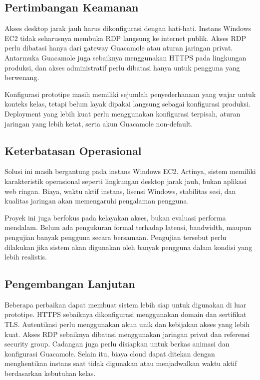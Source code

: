 \documentclass[conference]{IEEEtran}
\begin{document}
\subsection{Pertimbangan Keamanan}

Akses desktop jarak jauh harus dikonfigurasi dengan hati-hati. Instans Windows EC2 tidak seharusnya membuka RDP langsung ke internet publik. Akses RDP perlu dibatasi hanya dari gateway Guacamole atau aturan jaringan privat. Antarmuka Guacamole juga sebaiknya menggunakan HTTPS pada lingkungan produksi, dan akses administratif perlu dibatasi hanya untuk pengguna yang berwenang.

Konfigurasi prototipe masih memiliki sejumlah penyederhanaan yang wajar untuk konteks kelas, tetapi belum layak dipakai langsung sebagai konfigurasi produksi. Deployment yang lebih kuat perlu menggunakan konfigurasi terpisah, aturan jaringan yang lebih ketat, serta akun Guacamole non-default.

\subsection{Keterbatasan Operasional}

Solusi ini masih bergantung pada instans Windows EC2. Artinya, sistem memiliki karakteristik operasional seperti lingkungan desktop jarak jauh, bukan aplikasi web ringan. Biaya, waktu aktif instans, lisensi Windows, stabilitas sesi, dan kualitas jaringan akan memengaruhi pengalaman pengguna.

Proyek ini juga berfokus pada kelayakan akses, bukan evaluasi performa mendalam. Belum ada pengukuran formal terhadap latensi, bandwidth, maupun pengujian banyak pengguna secara bersamaan. Pengujian tersebut perlu dilakukan jika sistem akan digunakan oleh banyak pengguna dalam kondisi yang lebih realistis.

\subsection{Pengembangan Lanjutan}

Beberapa perbaikan dapat membuat sistem lebih siap untuk digunakan di luar prototipe. HTTPS sebaiknya dikonfigurasi menggunakan domain dan sertifikat TLS. Autentikasi perlu menggunakan akun unik dan kebijakan akses yang lebih kuat. Akses RDP sebaiknya dibatasi menggunakan jaringan privat dan referensi security group. Cadangan juga perlu disiapkan untuk berkas animasi dan konfigurasi Guacamole. Selain itu, biaya cloud dapat ditekan dengan menghentikan instans saat tidak digunakan atau menjadwalkan waktu aktif berdasarkan kebutuhan kelas.
\end{document}
